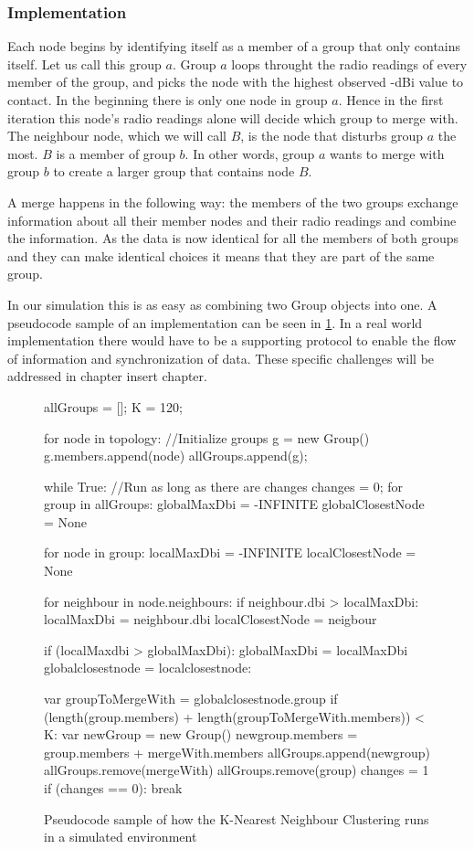 \subsubsection{Implementation}
Each node begins by identifying itself as a member of a group that only contains itself.  Let us call this group $a$.
Group $a$ loops throught the radio readings of every member of the group, and picks the node with the highest observed -dBi value
to contact. In the beginning there is only one node in group $a$. Hence in the first iteration this node's radio readings alone will decide which group to merge with. 
The neighbour node, which we will call $B$, is the node that disturbs group $a$ the most. $B$ is a member of group $b$.
In other words, group $a$ wants to merge with group $b$ to create a larger group that contains node $B$.

A merge happens in the following way: the members of the two groups exchange information about all their member nodes and their radio readings and combine the information.
As the data is now identical for all the members of both groups and they can make identical choices it means that they are part of the same group. 

In our simulation this is as easy as combining two Group objects into one. A pseudocode sample of an implementation can be seen in \ref{fig:groupmerge}.
In a real world implementation there would have to be a supporting protocol to 
enable the flow of information and synchronization of data. These specific challenges will be addressed in chapter {{insert chapter}}.

	\begin{figure}[H]
		\tiny
		\begin{python}
allGroups = [];
K = 120;

for node in topology: //Initialize groups
	g = new Group()
	g.members.append(node)
	allGroups.append(g);

while True: //Run as long as there are changes
	changes = 0;	
	for group in allGroups: 
		globalMaxDbi = -INFINITE
		globalClosestNode = None

		for node in group:
			localMaxDbi = -INFINITE
			localClosestNode = None

			for neighbour in node.neighbours:
				if neighbour.dbi > localMaxDbi:
					localMaxDbi = neighbour.dbi
					localClosestNode = neigbour

			if (localMaxdbi > globalMaxDbi):
				globalMaxDbi = localMaxDbi
				globalclosestnode = localclosestnode:

		var groupToMergeWith = globalclosestnode.group
		if (length(group.members) + length(groupToMergeWith.members)) < K:
			var newGroup = new Group()
			newgroup.members = group.members + mergeWith.members
			allGroups.append(newgroup)
			allGroups.remove(mergeWith)
			allGroups.remove(group)
			changes = 1
	if (changes == 0):
		break
		\end{python}
			\caption{Pseudocode sample of how the K-Nearest Neighbour Clustering runs in a simulated environment}
			\label{fig:groupmerge}
	\end{figure}



